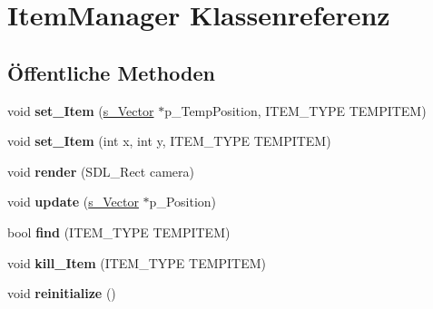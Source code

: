 \hypertarget{class_item_manager}{\section{Item\-Manager Klassenreferenz}
\label{class_item_manager}
}
\subsection*{Öffentliche Methoden}
\begin{DoxyCompactItemize}
\item 
\hypertarget{class_item_manager_ad15fabe46ac5fab89a6b857c53e79dee}{void {\bfseries set\-\_\-\-Item} (\hyperlink{structs___vector}{s\-\_\-\-Vector} $\ast$p\-\_\-\-Temp\-Position, I\-T\-E\-M\-\_\-\-T\-Y\-P\-E T\-E\-M\-P\-I\-T\-E\-M)}\label{class_item_manager_ad15fabe46ac5fab89a6b857c53e79dee}

\item 
\hypertarget{class_item_manager_a1f0ef737a253bec0e41ca8807b65e45f}{void {\bfseries set\-\_\-\-Item} (int x, int y, I\-T\-E\-M\-\_\-\-T\-Y\-P\-E T\-E\-M\-P\-I\-T\-E\-M)}\label{class_item_manager_a1f0ef737a253bec0e41ca8807b65e45f}

\item 
\hypertarget{class_item_manager_af436e023ae2f467062fb055581b64923}{void {\bfseries render} (S\-D\-L\-\_\-\-Rect camera)}\label{class_item_manager_af436e023ae2f467062fb055581b64923}

\item 
\hypertarget{class_item_manager_a17e930f7669eb96bdcb49684f2254abb}{void {\bfseries update} (\hyperlink{structs___vector}{s\-\_\-\-Vector} $\ast$p\-\_\-\-Position)}\label{class_item_manager_a17e930f7669eb96bdcb49684f2254abb}

\item 
\hypertarget{class_item_manager_a6c7a0dd9e6b3fe92b679e6bc16313f86}{bool {\bfseries find} (I\-T\-E\-M\-\_\-\-T\-Y\-P\-E T\-E\-M\-P\-I\-T\-E\-M)}\label{class_item_manager_a6c7a0dd9e6b3fe92b679e6bc16313f86}

\item 
\hypertarget{class_item_manager_a640397ad936bbeee930fe36c2a4d26aa}{void {\bfseries kill\-\_\-\-Item} (I\-T\-E\-M\-\_\-\-T\-Y\-P\-E T\-E\-M\-P\-I\-T\-E\-M)}\label{class_item_manager_a640397ad936bbeee930fe36c2a4d26aa}

\item 
\hypertarget{class_item_manager_a8365907614865dc5190627381e954c91}{void {\bfseries reinitialize} ()}\label{class_item_manager_a8365907614865dc5190627381e954c91}


\end{DoxyCompactItemize}
